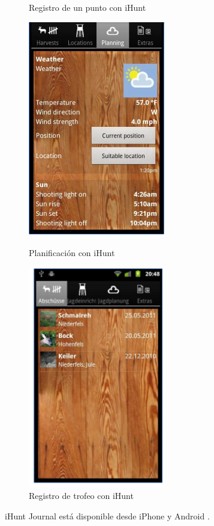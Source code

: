 \begin{figure}[htbp]
\begin{minipage}[b]{0.5\linewidth}
\caption{Registro de un punto con iHunt}
\label{fig:iHunt2}
\end{minipage}
\begin{minipage}[b]{0.5\linewidth}
\centering
\includegraphics[width=6cm]{iHunt3.png}

\caption{Planificación con iHunt}
\label{fig:iHunt3}
\end{minipage}
\begin{minipage}[b]{0.5\linewidth}
\centering
\includegraphics[width=6cm]{iHunt4.png}

\caption{Registro de trofeo con iHunt}
\label{fig:iHunt4}
\end{minipage}
\end{figure}

iHunt Journal está disponible desde iPhone y Android .


